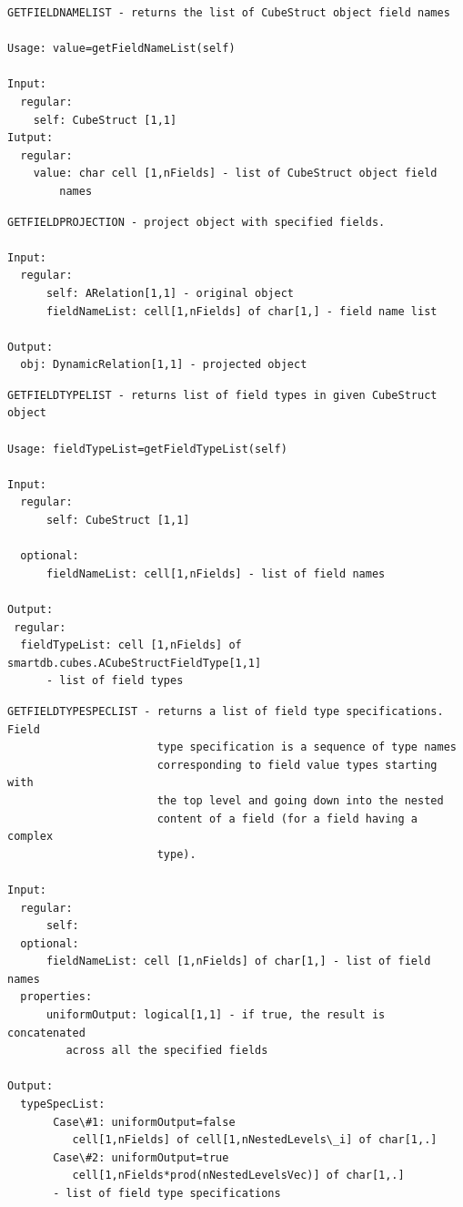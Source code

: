 \documentclass[letterpaper,10pt,english]{sphinxmanual}
\begin{document}
\begin{Verbatim}[commandchars=\\\{\}]
GETFIELDNAMELIST - returns the list of CubeStruct object field names

Usage: value=getFieldNameList(self)

Input:
  regular:
    self: CubeStruct [1,1]
Iutput:
  regular:
    value: char cell [1,nFields] - list of CubeStruct object field
        names
\end{Verbatim}

\begin{Verbatim}[commandchars=\\\{\}]
GETFIELDPROJECTION - project object with specified fields.

Input:
  regular:
      self: ARelation[1,1] - original object
      fieldNameList: cell[1,nFields] of char[1,] - field name list

Output:
  obj: DynamicRelation[1,1] - projected object
\end{Verbatim}

\begin{Verbatim}[commandchars=\\\{\}]
GETFIELDTYPELIST - returns list of field types in given CubeStruct object

Usage: fieldTypeList=getFieldTypeList(self)

Input:
  regular:
      self: CubeStruct [1,1]

  optional:
      fieldNameList: cell[1,nFields] - list of field names

Output:
 regular:
  fieldTypeList: cell [1,nFields] of smartdb.cubes.ACubeStructFieldType[1,1]
      - list of field types
\end{Verbatim}

\begin{Verbatim}[commandchars=\\\{\}]
GETFIELDTYPESPECLIST - returns a list of field type specifications. Field
                       type specification is a sequence of type names
                       corresponding to field value types starting with
                       the top level and going down into the nested
                       content of a field (for a field having a complex
                       type).

Input:
  regular:
      self:
  optional:
      fieldNameList: cell [1,nFields] of char[1,] - list of field names
  properties:
      uniformOutput: logical[1,1] - if true, the result is concatenated
         across all the specified fields

Output:
  typeSpecList:
       Case\#1: uniformOutput=false
          cell[1,nFields] of cell[1,nNestedLevels\_i] of char[1,.]
       Case\#2: uniformOutput=true
          cell[1,nFields*prod(nNestedLevelsVec)] of char[1,.]
       - list of field type specifications
\end{Verbatim}
\end{document}
